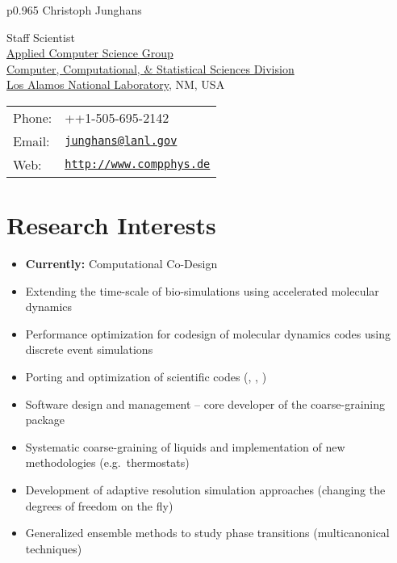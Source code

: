 \documentclass{article}
\begin{document}
\thispagestyle{plain}
\vspace*{-1.2cm}

\begin{tabular}{p{0.965\textwidth}}
{\huge Christoph Junghans}\\
\hline
\end{tabular}
\vspace{0.2in}

\begin{minipage}{0.55\linewidth}
  Staff Scientist\\ 
  \href{http://www.ccs.lanl.gov/ccs7.shtml} {Applied Computer Science Group}\\
  \href{http://www.ccs.lanl.gov/} {Computer, Computational, \& Statistical Sciences Division}\\
  \href{http://www.lanl.gov}{Los Alamos National Laboratory}, NM, USA
\end{minipage}
\begin{minipage}{0.45\linewidth}
  \begin{tabular}{ll}
    Phone: & ++1-505-695-2142 \\
    Email: & \href{mailto:junghans@lanl.gov}{\tt junghans@lanl.gov} \\
    Web: & \href{http://www.compphys.de}{\tt http://www.compphys.de} \\
  \end{tabular}
\end{minipage}

\section*{Research Interests}
\begin{itemize}
\setlength{\itemsep}{0pt}
\setlength{\parskip}{0pt}
\setlength{\parsep}{0pt}
\item \textbf{Currently:} Computational Co-Design 
\item Extending the time-scale of bio-simulations using accelerated molecular dynamics
\item Performance optimization for codesign of molecular dynamics codes using discrete event simulations
\item Porting and optimization of scientific codes (, , )
\item Software design and management -- core developer of the coarse-graining package 
\item Systematic coarse-graining of liquids and implementation of new methodologies (e.g.\ thermostats)
\item Development of adaptive resolution simulation approaches (changing the degrees of freedom on the fly)
\item Generalized ensemble methods to study phase transitions (multicanonical techniques)
\end{itemize}
\end{document}
